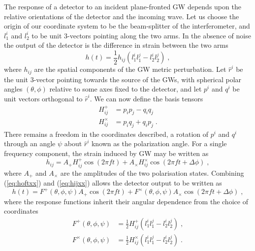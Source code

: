 The response of a detector to an incident plane-fronted GW depends upon the relative orientations of the detector and the incoming wave. Let us choose the origin of our coordinate system to be the beam-splitter of the interferometer, and $l_{1}^{i}$ and $l_{2}^{i}$ to be unit 3-vectors pointing along the two arms. In the absence of noise the output of the detector is the difference in strain between the two arms \citep{Thorne1987}
\begin{equation}\label{eq:hoftxx}
h(t)=\frac{1}{2}h_{ij}\left( l_{1}^{i}l_{1}^{j}-l_{2}^{i}l_{2}^{j} \right)\; ,
\end{equation}
where $h_{ij}$ are the spatial components of the GW metric perturbation. Let $\hat{r}^{i}$ be the unit 3-vector pointing towards the source of the GWs, with spherical polar angles $(\theta,\phi)$ relative to some axes fixed to the detector, and let $p^{i}$ and $q^{i}$ be unit vectors orthogonal to $\hat{r}^{i}$. We can now define the basis tensors
\begin{eqnarray}
H^{+}_{ij}&=p_{i}p_{j}-q_{i}q_{j} \nonumber \\
H^{\times}_{ij}&=p_{i}q_{j}+q_{i}p_{j} \; .
\end{eqnarray}
There remains a freedom in the coordinates described, a rotation of $p^{i}$ and $q^{i}$ through an angle $\psi$ about $\hat{r}^{i}$ known as the polarization angle. For a single frequency component, the strain induced by GW may be written as
\begin{equation}\label{eq:hijxx}
h_{ij}=A_{+}H^{+}_{ij}\cos\left(2\pi ft\right)+A_{\times}H^{\times}_{ij}\cos\left(2\pi ft+\Delta \phi\right) \; ,
\end{equation}
where $A_{+}$ and $A_{\times}$ are the amplitudes of the two polarisation states. Combining (\ref{eq:hoftxx}) and (\ref{eq:hijxx}) allows the detector output to be written as
\begin{equation}
h(t)=F^{+}(\theta,\phi,\psi)A_{+}\cos\left(2\pi ft\right)+F^{\times}(\theta,\phi,\psi)A_{\times}\cos\left(2\pi f t + \Delta\phi \right)\; ,
\end{equation}
where the response functions inherit their angular dependence from the choice of coordinates
\begin{eqnarray}\label{eq:responsefuncs}
F^{+}(\theta,\phi,\psi)&=\frac{1}{2}H^{+}_{ij}\left(l_{1}^{i}l_{1}^{j}-l_{2}^{i}l_{2}^{j}\right) \; , \\
F^{\times}(\theta,\phi,\psi)&=\frac{1}{2}H^{\times}_{ij}\left(l_{1}^{i}l_{1}^{j}-l_{2}^{i}l_{2}^{j}\right) \; . 
\end{eqnarray}


